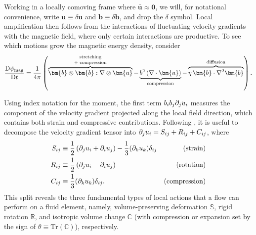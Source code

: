 \documentclass[12pt,twoside]{extreport}
\newcommand{\rbrac}[1]{\left( #1 \right)} %
\newcommand{\mVector}[1]{\bm{#1}} %
\newcommand{\mTensor}[1]{\mathbb{#1}} %
\newcommand{\mpp}[1]{\partial #1}
\newcommand{\mDD}[1]{\mathrm{D} #1}
\newcommand{\mDDFrac}[2]{\frac{\mDD{#1}}{\mDD{#2}}}
\begin{document}
Working in a locally comoving frame where $\bar{\mVector{u}} \approx \mVector{0}$, we will, for notational convenience, write $\mVector{u} \equiv \delta\mVector{u}$ and $\mVector{b} \equiv \delta\mVector{b}$, and drop the $\delta$ symbol. Local amplification  then follows from the interactions of fluctuating velocity gradients with the magnetic field, where only certain interactions are productive. To see which motions grow the magnetic energy density, consider
\begin{align}
    \mDDFrac{\psi_\mathrm{mag}}{t}
        = \frac{1}{4\pi} \rbrac{
                \overbrace{
                    \mVector{b}\otimes\mVector{b}:\nabla\otimes\mVector{u}
                }^\text{\shortstack{stretching\\ + compression}}
                - \underbrace{
                    b^2 \rbrac{\nabla\cdot\mVector{u}}
                }_\text{compression}
                - \overbrace{
                    \eta \,\mVector{b}\cdot\nabla^2\mVector{b}
                }^\text{diffusion}
            }
        \label{eqn:induction:lagrangian}
    .
\end{align}

Using index notation for the moment, the first term $ b_i b_j \mpp_j u_i $ measures the component of the velocity gradient projected along the local field direction, which contains both strain and compressive contributions. Following \citet{beattie2023bulk}, it is useful to decompose the velocity gradient tensor into $\mpp_j u_i = S_{ij} + R_{ij} + C_{ij}$, where
\begin{align}
    S_{ij}
        &\equiv \frac{1}{2} \rbrac{\mpp_j u_i + \mpp_i u_j}
            - \frac{1}{3} (\mpp_k u_k) \delta_{ij}
        & \mbox{(strain)} \\
    R_{ij}
        &\equiv \frac{1}{2} \rbrac{\mpp_j u_i - \mpp_i u_j}
        & \mbox{(rotation)} \\
    C_{ij}
        &\equiv \frac{1}{3} (\mpp_k u_k) \delta_{ij}
        . & \mbox{(compression)}
\end{align}
This split reveals the three fundamental types of local actions that a flow can perform on a fluid element, namely, volume-preserving deformation $\mTensor{S}$, rigid rotation $\mTensor{R}$, and isotropic volume change $\mTensor{C}$ (with compression or expansion set by the sign of $\theta \equiv \mathrm{Tr}(\mTensor{C})$), respectively.
\end{document}
